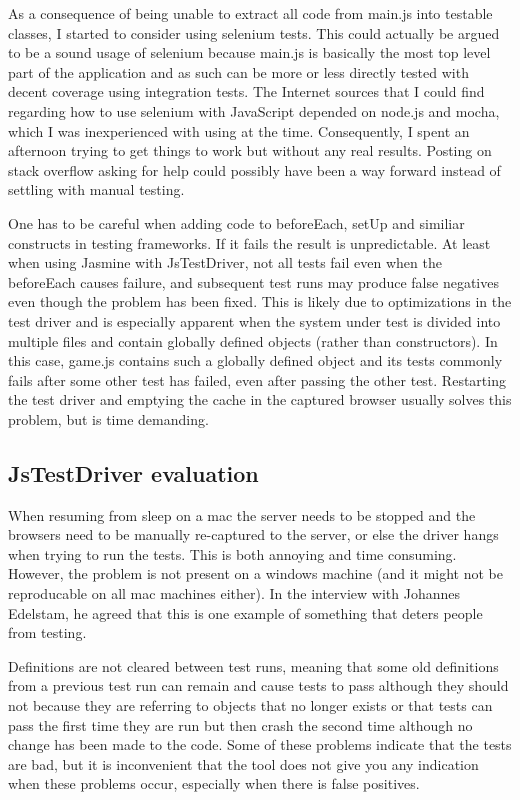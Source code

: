 \documentclass[11pt]{article}
\begin{document}
As a consequence of being unable to extract all code from main.js into testable classes, I started to consider using selenium tests. This could actually be argued to be a sound usage of selenium because main.js is basically the most top level part of the application and as such can be more or less directly tested with decent coverage using integration tests. The Internet sources that I could find regarding how to use selenium with JavaScript depended on node.js and mocha, which I was inexperienced with using at the time. Consequently, I spent an afternoon trying to get things to work but without any real results. Posting on stack overflow asking for help could possibly have been a way forward instead of settling with manual testing.

One has to be careful when adding code to beforeEach, setUp and similiar constructs in testing frameworks. If it fails the result is unpredictable. At least when using Jasmine with JsTestDriver, not all tests fail even when the beforeEach causes failure, and subsequent test runs may produce false negatives even though the problem has been fixed. This is likely due to optimizations in the test driver and is especially apparent when the system under test is divided into multiple files and contain globally defined objects (rather than constructors). In this case, game.js contains such a globally defined object and its tests commonly fails after some other test has failed, even after passing the other test. Restarting the test driver and emptying the cache in the captured browser usually solves this problem, but is time demanding.

\subsection{JsTestDriver evaluation}

When resuming from sleep on a mac the server needs to be stopped and the browsers need to be manually re-captured to the server, or else the driver hangs when trying to run the tests. This is both annoying and time consuming. However, the problem is not present on a windows machine (and it might not be reproducable on all mac machines either). In the interview with Johannes Edelstam, he agreed that this is one example of something that deters people from testing\cite{Edelstam}.

Definitions are not cleared between test runs, meaning that some old definitions from a previous test run can remain and cause tests to pass although they should not because they are referring to objects that no longer exists or that tests can pass the first time they are run but then crash the second time although no change has been made to the code. Some of these problems indicate that the tests are bad, but it is inconvenient that the tool does not give you any indication when these problems occur, especially when there is false positives.
\end{document}
